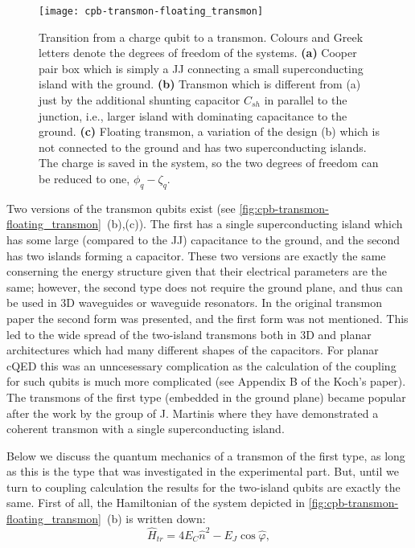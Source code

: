 \begin{figure}[h!]
\centering
\texttt{[image: cpb-transmon-floating\_transmon]}
\caption{Transition from a charge qubit to a transmon. Colours and Greek letters denote the degrees of freedom of the systems. \textbf{(a)} Cooper pair box which is simply a JJ connecting a small superconducting island with the ground. \textbf{(b)} Transmon which is different from (a) just by the additional shunting capacitor $C_{sh}$ in parallel to the junction, i.e., larger island with dominating capacitance to the ground. \textbf{(c)} Floating transmon, a variation of the design (b) which is not connected to the ground and has two superconducting islands. The charge is saved in the system, so the two degrees of freedom can be reduced to one, $\phi_q - \zeta_q$.}
\label{fig:cpb-transmon-floating_transmon}
\end{figure}

Two versions of the transmon qubits exist (see \autoref{fig:cpb-transmon-floating_transmon}~(b),(c)). The first has a single superconducting island which has some large (compared to the JJ) capacitance to the ground, and the second has two islands forming a capacitor. These two versions are exactly the same conserning the energy structure given that their electrical parameters are the same; however, the second type does not require the ground plane, and thus can be used in 3D waveguides or waveguide resonators\cite{paik2011}. In the original transmon paper\cite{Koch2007} the second form was presented, and the first form was not mentioned. This led to the wide spread of the two-island transmons both in 3D and planar architectures which had many different shapes of the capacitors. For planar cQED this was an unncesessary complication as the calculation of the coupling for such qubits is much more complicated (see Appendix B of the Koch's paper). The transmons of the first type (embedded in the ground plane) became popular after the work\cite{barends2013} by the group of J. Martinis where they have demonstrated a coherent transmon with a single superconducting island.

Below we discuss the quantum mechanics of a transmon of the first type, as long as this is the type that was investigated in the experimental part. But, until we turn to coupling calculation the results for the two-island qubits are exactly the same. First of all, the Hamiltonian of the system depicted in \autoref{fig:cpb-transmon-floating_transmon}~(b) is written down:
\begin{equation}
\hat H_{tr} = 4E_C \hat n^2 - E_J\cos \hat \varphi,
\label{eq:tr_ham}
\end{equation}

